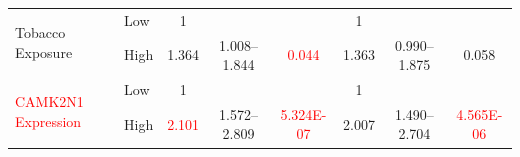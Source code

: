 \documentclass[12pt, a4paper]{article}
\begin{document}
\begin{table}[hp]
{\begin{tabular}{|l|l|c|c|c|c|c|c|}
\hline
\multirow{2}{*}{Tobacco Exposure}       & {\cellcolor[rgb]{0.62,0.812,0.878}}Low                                              & {\cellcolor[rgb]{0.62,0.812,0.878}}1                                           & {\cellcolor[rgb]{0.62,0.812,0.878}}                                           & {\cellcolor[rgb]{0.62,0.812,0.878}}                                           & {\cellcolor[rgb]{0.62,0.812,0.878}}1                                           & {\cellcolor[rgb]{0.62,0.812,0.878}}                                           & {\cellcolor[rgb]{0.62,0.812,0.878}}                                            \\ 
\cline{2-8}
                                        & High                                                                                & 1.364                                                                          & 1.008--1.844                                                                   & \textcolor{red}{0.044}                                                        & 1.363                                                                          & 0.990--1.875                                                                   & 0.058                                                                          \\ 
\hline
\multirow{2}{*}{\textcolor{red}{CAMK2N1 Expression}}                & {\cellcolor[rgb]{0.62,0.812,0.878}}Low                                              & {\cellcolor[rgb]{0.62,0.812,0.878}}1                                           & {\cellcolor[rgb]{0.62,0.812,0.878}}                                           & {\cellcolor[rgb]{0.62,0.812,0.878}}                                           & {\cellcolor[rgb]{0.62,0.812,0.878}}1                                           & {\cellcolor[rgb]{0.62,0.812,0.878}}                                           & {\cellcolor[rgb]{0.62,0.812,0.878}}                                            \\ 
\cline{2-8}
                                        & High                                                                                & \textcolor{red}{2.101}                                                                                        & 1.572--2.809                                                                   & \multicolumn{1}{c|}{\textcolor{red}{\num{5.324E-07}}}       %
                                        & 2.007                                                                          & 1.490--2.704                                                                   & \multicolumn{1}{c|}{\textcolor{red}{\num{4.565E-06}}}       %

\end{tabular}}
\end{table}
\end{document}
